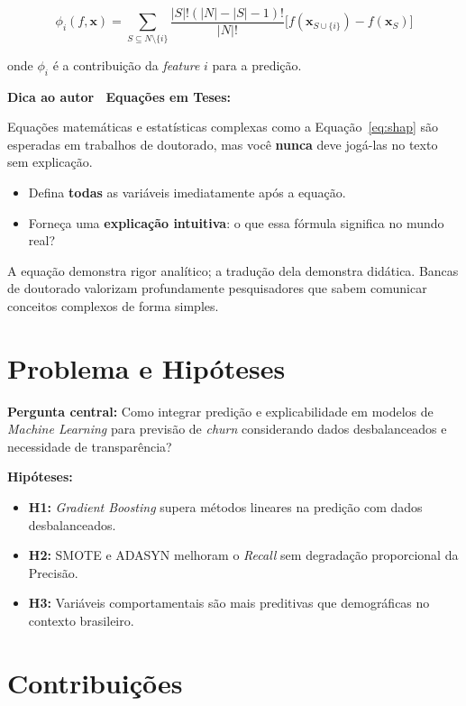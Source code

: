\documentclass[
    12pt,
    oneside,
    a4paper,
    english,
    brazilian
    ]{abntex2}
\numberwithin{equation}{chapter}
\newenvironment{dica}{%
    \par\medskip
    \color{blue!60!black}\small\itshape
}{%
    \par\medskip
}
\begin{document}
\begin{equation}
    \phi_i(f, \mathbf{x}) = \sum_{S \subseteq N \setminus \{i\}} \frac{|S|! (|N| - |S| - 1)!}{|N|!} \bigl[f(\mathbf{x}_{S \cup \{i\}}) - f(\mathbf{x}_S)\bigr]
    \label{eq:shap}
\end{equation}

onde $\phi_i$ é a contribuição da \textit{feature} $i$ para a predição.

\begin{dica}
\noindent\textbf{Dica ao autor \textemdash\ Equações em Teses:}

Equações matemáticas e estatísticas complexas como a Equação~\ref{eq:shap} são esperadas em trabalhos de doutorado, mas você \textbf{nunca} deve jogá-las no texto sem explicação.
\begin{itemize}
    \item Defina \textbf{todas} as variáveis imediatamente após a equação.
    \item Forneça uma \textbf{explicação intuitiva}: o que essa fórmula significa no mundo real?
\end{itemize}
A equação demonstra rigor analítico; a tradução dela demonstra didática. Bancas de doutorado valorizam profundamente pesquisadores que sabem comunicar conceitos complexos de forma simples.
\end{dica}

\section{Problema e Hipóteses}

\textbf{Pergunta central:} Como integrar predição e explicabilidade em modelos de \textit{Machine Learning} para previsão de \textit{churn} considerando dados desbalanceados e necessidade de transparência?

\textbf{Hipóteses:}
\begin{itemize}
    \item \textbf{H1:} \textit{Gradient Boosting} supera métodos lineares na predição com dados desbalanceados.
    \item \textbf{H2:} SMOTE e ADASYN melhoram o \textit{Recall} sem degradação proporcional da Precisão.
    \item \textbf{H3:} Variáveis comportamentais são mais preditivas que demográficas no contexto brasileiro.
\end{itemize}

\section{Contribuições}
\end{document}
